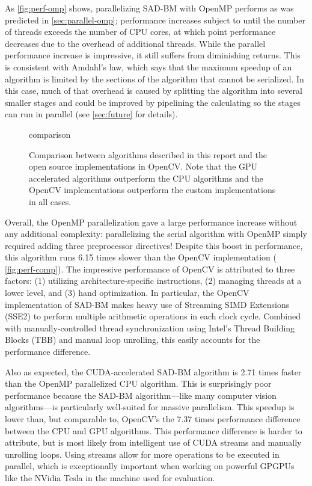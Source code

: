 \documentclass{article}
\let\orgautoref\autoref
\providecommand{\Autoref}
        {\def\equationautorefname{Equation}%
         \def\figureautorefname{Figure}%
         \def\subfigureautorefname{Figure}%
         \def\Itemautorefname{Item}%
         \def\tableautorefname{Table}%
         \def\sectionautorefname{Section}%
         \def\subsectionautorefname{Section}%
         \def\subsubsectionautorefname{Section}%
         \def\chapterautorefname{Section}%
         \def\partautorefname{Part}%
         \orgautoref}
\begin{document}
As \Autoref{fig:perf-omp} shows, parallelizing SAD-BM with OpenMP performs as
was predicted in \Autoref{sec:parallel-omp}; performance increases subject to
until the number of threads exceeds the number of CPU cores, at which point
performance decreases due to the overhead of additional threads. While the
parallel performance increase is impressive, it still suffers from diminishing
returns. This is consistent with Amdahl's law, which says that the maximum
speedup of an algorithm is limited by the sections of the algorithm that cannot
be serialized. In this case, much of that overhead is caused by splitting the
algorithm into several smaller stages and could be improved by pipelining the
calculating so the stages can run in parallel (see \Autoref{sec:future} for
details).

\begin{figure}
    \centering
    {comparison}
    \caption{
        Comparison between algorithms described in this report and the open
        source implementations in OpenCV. Note that the GPU accelerated
        algorithms outperform the CPU algorithms and the OpenCV implementations
        outperform the custom implementations in all cases.
    }
    \label{fig:perf-comp}
\end{figure}

Overall, the OpenMP parallelization gave a large performance increase without
any additional complexity: parallelizing the serial algorithm with OpenMP
simply required adding three preprocessor directives! Despite this boost in
performance, this algorithm runs 6.15 times slower than the OpenCV
implementation (\Autoref{fig:perf-comp}). The impressive performance of OpenCV
is attributed to three factors: (1) utilizing architecture-specific
instructions, (2) managing threads at a lower level, and (3) hand optimization.
In particular, the OpenCV implementation of SAD-BM makes heavy use of Streaming
SIMD Extensions (SSE2) to perform multiple arithmetic operations in each clock
cycle. Combined with manually-controlled thread synchronization using Intel's
Thread Building Blocks (TBB) and manual loop unrolling, this easily accounts
for the performance difference.

Also as expected, the CUDA-accelerated SAD-BM algorithm is 2.71 times faster
than the OpenMP parallelized CPU algorithm. This is surprisingly poor
performance because the SAD-BM algorithm---like many computer vision
algorithms---is particularly well-suited for massive parallelism. This speedup
is lower than, but comparable to, OpenCV's the 7.37 times performance
difference between the CPU and GPU algorithms. This performance difference is
harder to attribute, but is most likely from intelligent use of CUDA streams
and manually unrolling loops. Using streams allow for more operations to be
executed in parallel, which is exceptionally important when working on powerful
GPGPUs like the NVidia Tesla in the machine used for evaluation.
\end{document}
